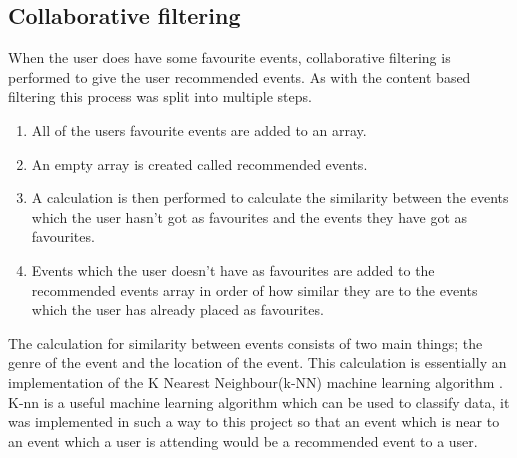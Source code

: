 \subsection{Collaborative filtering}
When the user does have some favourite events, collaborative filtering is performed to give the user recommended events. As with the content based filtering this process was split into multiple steps.
\begin{enumerate} 
  \item All of the users favourite events are added to an array.
  \item An empty array is created called recommended events.
  \item A calculation is then performed to calculate the similarity between the events which the user hasn't got as favourites and the events they have got as favourites.
  \item Events which the user doesn't have as favourites are added to the recommended events array in order of how similar they are to the events which the user has already placed as favourites.
\end{enumerate}
The calculation for similarity between events consists of two main things; the genre of the event and the location of the event. This calculation is essentially an implementation of the K Nearest Neighbour(k-NN) machine learning algorithm \cite{knn} \cite{knn2}. K-nn is a useful machine learning algorithm which can be used to classify data, it was implemented in such a way to this project so that an event which is near to an event which a user is attending would be a recommended event to a user.


